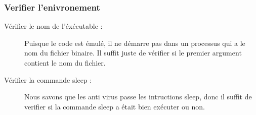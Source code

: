         \subsubsection{Verifier l'enivronement}
        \begin{description}
            \item[Vérifier le nom de l'éxécutable :] Puisque le code est émulé, il ne démarre pas dans un processus qui a le nom du fichier binaire. Il suffit juste de vérifier si le premier argument contient le nom du fichier.

            \item[Vérifier la commande sleep :] Nous savons que les anti virus passe les intructions sleep, donc il suffit de verifier si la commande sleep a était bien exécuter ou non.
        \end{description}






